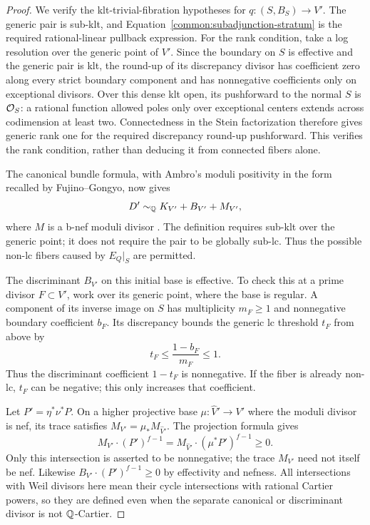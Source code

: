 \begin{proof}
We verify the klt-trivial-fibration hypotheses for
$q:(S,B_S)\to V'$. The generic pair is sub-klt, and
Equation~\eqref{common:subadjunction-stratum} is the required rational-linear
pullback expression. For the rank condition, take a log resolution
over the generic point of $V'$. Since the boundary on $S$ is
effective and the generic pair is klt, the round-up of its
discrepancy divisor has coefficient zero along every strict
boundary component and has nonnegative coefficients only on
exceptional divisors. Over this dense klt open, its pushforward to the normal $S$ is
$\mathcal{O}_S$: a rational function allowed poles only over exceptional
centers extends across codimension at least two. Connectedness
in the Stein factorization therefore gives generic rank one for
the required discrepancy round-up pushforward. This verifies the
rank condition, rather than deducing it from connected fibers
alone.

The canonical bundle formula, with Ambro's moduli positivity in
the form recalled by Fujino--Gongyo, now gives
\begin{equation}
\label{common:subadjunction-cbf}
 D'\sim_{\mathbb{Q}}K_{V'}+B_{V'}+M_{V'},
\end{equation}
where $M$ is a b-nef moduli divisor
\cite[Definition~3.1 and Theorem~3.5]{FujinoGongyoModuli2014}.
The definition requires sub-klt over the generic point; it does
not require the pair to be globally sub-lc. Thus the possible
non-lc fibers caused by $E_Q|_S$ are permitted.

The discriminant $B_{V'}$ on this initial base is effective. To
check this at a prime divisor $F\subset V'$, work over its generic
point, where the base is regular. A component of its inverse
image on $S$ has multiplicity $m_F\geq1$ and nonnegative boundary
coefficient $b_F$. Its discrepancy bounds the generic lc threshold
$t_F$ from above by
\[
 t_F\leq\frac{1-b_F}{m_F}\leq1.
\]
Thus the discriminant coefficient $1-t_F$ is nonnegative. If the
fiber is already non-lc, $t_F$ can be negative; this only increases
that coefficient.

Let $P'=\eta^*\nu^*P$. On a higher projective base
$\mu:\widehat V'\to V'$ where the moduli divisor is nef, its
trace satisfies $M_{V'}=\mu_*M_{\widehat V'}$. The projection
formula gives
\[
 M_{V'}\cdot(P')^{f-1}
 =M_{\widehat V'}\cdot(\mu^*P')^{f-1}\geq0.
\]
Only this intersection is asserted to be nonnegative; the trace
$M_{V'}$ need not itself be nef. Likewise
$B_{V'}\cdot(P')^{f-1}\geq0$ by effectivity and nefness.
All intersections with Weil divisors here mean their cycle
intersections with rational Cartier powers, so they are defined
even when the separate canonical or discriminant divisor is not
$\mathbb{Q}$-Cartier.


\end{proof}
